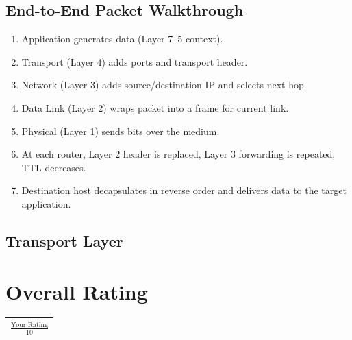 \documentclass[12pt,a4paper]{article}
\begin{document}
\subsection*{End-to-End Packet Walkthrough}
\begin{enumerate}
    \item Application generates data (Layer 7--5 context).
    \item Transport (Layer 4) adds ports and transport header.
    \item Network (Layer 3) adds source/destination IP and selects next hop.
    \item Data Link (Layer 2) wraps packet into a frame for current link.
    \item Physical (Layer 1) sends bits over the medium.
    \item At each router, Layer 2 header is replaced, Layer 3 forwarding is repeated, TTL decreases.
    \item Destination host decapsulates in reverse order and delivers data to the target application.
\end{enumerate}

\subsection{Transport Layer}

\section*{Overall Rating}
\begin{center}
\begin{tabular}{c}
    \hline
    $\displaystyle \frac{\text{Your Rating}}{10}$ \\
    \hline
\end{tabular}
\end{center}
\end{document}
